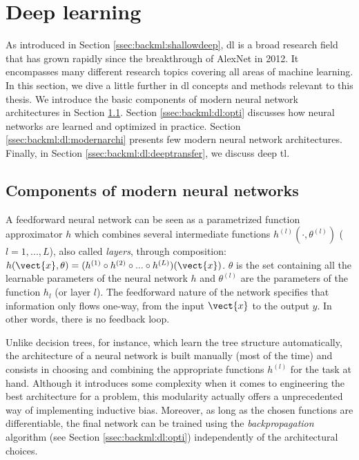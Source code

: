 \section{Deep learning}
\label{sec:backml:deeplearning}

As introduced in Section \ref{ssec:backml:shallowdeep}, \acrlong{dl} is a broad research field that has grown rapidly since the breakthrough of AlexNet in 2012. It encompasses many different research topics covering all areas of machine learning. In this section, we dive a little further in \acrlong{dl} concepts and methods relevant to this thesis. We introduce the basic components of modern neural network architectures in Section \ref{ssec:backml:dp:components}. Section \ref{ssec:backml:dl:opti} discusses how neural networks are learned and optimized in practice. Section \ref{ssec:backml:dl:modernarchi} presents few modern neural network architectures. Finally, in Section \ref{ssec:backml:dl:deeptransfer}, we discuss deep \acrlong{tl}.   

\subsection{Components of modern neural networks}
\label{ssec:backml:dp:components}

A feedforward neural network can be seen as a parametrized function approximator $h$ which combines several intermediate functions $h^{(l)}(\cdot, \theta^{(l)})$ ($l=1, ..., L$), also called \textit{layers}, through composition: $h(\vect{x}, \theta) = (h^{(1)} \circ h^{(2)} \circ ... \circ h^{(L)})(\vect{x})$. $\theta$ is the set containing all the learnable parameters of the neural network $h$ and $\theta^{(l)}$ are the parameters of the function $h_l$ (or layer $l$). The feedforward nature of the network specifies that information only flows one-way, from the input $\vect{x}$ to the output $y$. In other words, there is no feedback loop.

Unlike decision trees, for instance, which learn the tree structure automatically, the architecture of a neural network is built manually (most of the time) and consists in choosing and combining the appropriate functions $h^{(l)}$ for the task at hand. Although it introduces some complexity when it comes to engineering the best architecture for a problem, this modularity actually offers a unprecedented way of implementing inductive bias. Moreover, as long as the chosen functions are differentiable, the final network can be trained using the \textit{backpropagation} algorithm (see Section \ref{ssec:backml:dl:opti}) independently of the architectural choices.

